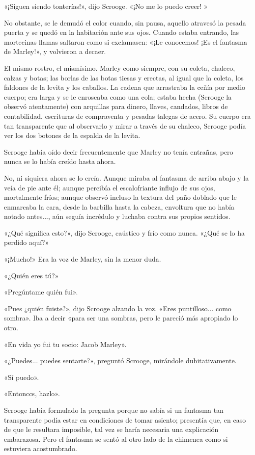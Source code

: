\documentclass{novela}
\begin{document}
 «¡Siguen siendo tonterías!», dijo Scrooge. «¡No me lo puedo creer! »

 No obstante, se le demudó el color cuando, sin pausa, aquello atravesó la pesada puerta y se quedó en la habitación ante sus ojos. Cuando estaba entrando, las mortecinas llamas saltaron como si exclamasen: «¡Le conocemos! ¡Es el fantasma de Marley!», y volvieron a decaer.

 El mismo rostro, el mismísimo. Marley como siempre, con su coleta, chaleco, calzas y botas; las borlas de las botas tiesas y erectas, al igual que la coleta, los faldones de la levita y los caballos. La cadena que arrastraba la ceñía por medio cuerpo; era larga y se le enroscaba como una cola; estaba hecha (Scrooge la observó atentamente) con arquillas para dinero, llaves, candados, libros de contabilidad, escrituras de compraventa y pesadas talegas de acero. Su cuerpo era tan transparente que al observarlo y mirar a través de su chaleco, Scrooge podía ver los dos botones de la espalda de la levita.

 Scrooge había oído decir frecuentemente que Marlcy no tenía entrañas, pero nunca se lo había creído hasta ahora.

 No, ni siquiera ahora se lo creía. Aunque miraba al fantasma de arriba abajo y la veía de pie ante él; aunque percibía el escalofriante influjo de sus ojos, mortalmente fríos; aunque observó incluso la textura del paño doblado que le enmarcaba la cara, desde la barbilla hasta la cabeza, envoltura que no había notado antes..., aún seguía incrédulo y luchaba contra sus propios sentidos.

 «¿Qué significa esto?», dijo Scrooge, caústico y frío como nunca. «¿Qué se lo ha perdido aquí?»

 «¡Mucho!» Era la voz de Marley, sin la menor duda.

 «¿Quién eres tú?»

 «Prcgúntame quién fui».

 «Pues ¿quién fuiste?», dijo Scrooge alzando la voz. «Eres puntilloso... como sombra». Iba a decir «para ser una sombras, pero le pareció más apropiado lo otro.

 «En vida yo fui tu socio: Jacob Marley».

 «¿Puedes... puedes sentarte?», preguntó Scrooge, mirándole dubitativamente.

 «Sí puedo».

 «Entonccs, hazlo».

 Scrooge había formulado la pregunta porque no sabía si un fantasma tan transparente podía estar en condiciones de tomar asiento; presentía que, en caso de que le resultara imposible, tal vez se haría necesaria una explicación embarazosa. Pero el fantasma se sentó al otro lado de la chimenea como si estuviera acostumbrado.
\end{document}
